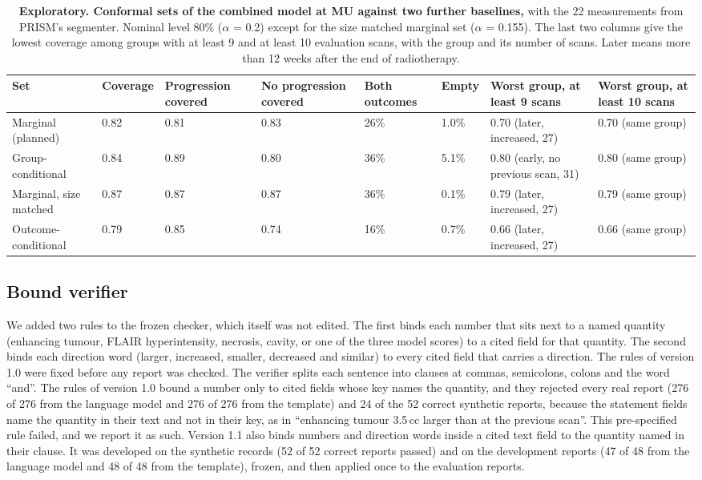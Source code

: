 \documentclass[11pt,a4paper]{article}
\begin{document}
\begin{table}[!htbp]
\renewcommand{\thetable}{S14}\renewcommand{\theHtable}{S14}
\centering
\caption{\textbf{Exploratory. Conformal sets of the combined model at MU against two further baselines,} with the 22
measurements from PRISM's segmenter. Nominal
level 80\% ($\alpha$ = 0.2) except for the size matched marginal set ($\alpha$ = 0.155). The last two columns give the
lowest coverage among groups with at least 9 and at least 10 evaluation scans, with the group and its number of scans.
Later means more than 12 weeks after the end of radiotherapy.}
\label{tab:S26f}
\scriptsize
\begin{tabularx}{\linewidth}{@{}LR{1.1cm}R{1.4cm}R{1.4cm}R{1.0cm}R{0.8cm}R{2.4cm}R{2.4cm}@{}}
\toprule
Set & Coverage & Progression covered & No progression covered & Both outcomes & Empty & Worst group, at least 9 scans & Worst group, at least 10 scans \\
\midrule
Marginal (planned) & 0.82 & 0.81 & 0.83 & 26\% & 1.0\% & 0.70 (later, increased, 27) & 0.70 (same group) \\
Group-conditional & 0.84 & 0.89 & 0.80 & 36\% & 5.1\% & 0.80 (early, no previous scan, 31) & 0.80 (same group) \\
Marginal, size matched & 0.87 & 0.87 & 0.87 & 36\% & 0.1\% & 0.79 (later, increased, 27) & 0.79 (same group) \\
Outcome-conditional & 0.79 & 0.85 & 0.74 & 16\% & 0.7\% & 0.66 (later, increased, 27) & 0.66 (same group) \\
\bottomrule
\end{tabularx}
\end{table}

\subsection{Bound verifier}\label{sec:S26.3}

We added two rules to the frozen checker, which itself was not edited. The first binds each number
that sits next to a named quantity (enhancing tumour, FLAIR hyperintensity, necrosis, cavity, or one of the three
model scores) to a cited field for that quantity. The second binds each direction word (larger, increased, smaller,
decreased and similar) to every cited field that carries a direction. The rules of version 1.0 were fixed before any
report was checked. The verifier splits each sentence into clauses at commas, semicolons, colons and the word ``and''. The rules of
version 1.0 bound a number only to cited fields whose key names the quantity, and they
rejected every real report (276 of 276 from the language model and 276 of 276 from the template) and 24 of the 52
correct synthetic reports, because the statement fields name the quantity in their text and not in their key, as in
``enhancing tumour 3.5\,cc larger than at the previous scan''. This
pre-specified rule failed, and we report it as such. Version 1.1 also binds numbers and direction
words inside a cited text field to the quantity named in their clause. It was developed on the synthetic records
(52 of 52 correct reports passed) and on the development reports (47 of 48 from the language model and 48 of 48 from
the template), frozen, and then applied once to the evaluation reports.
\end{document}
